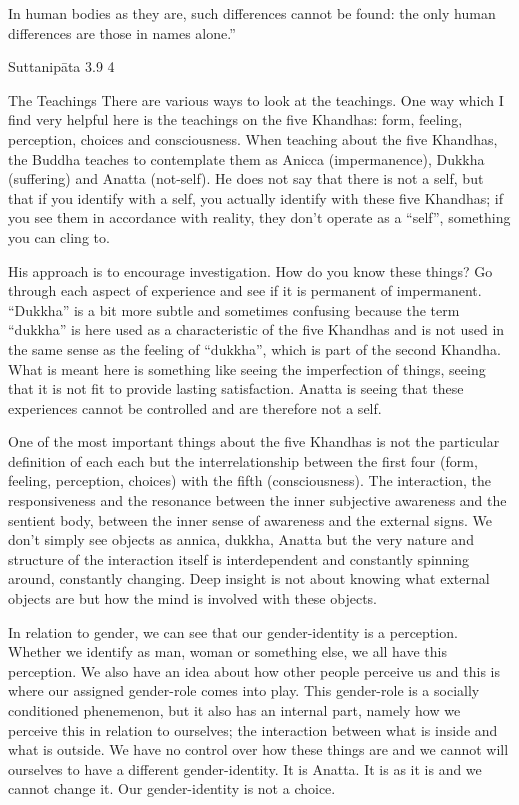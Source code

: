 In human bodies as they are,
such differences cannot be found:
the only human differences
are those in names alone.”

Suttanipāta 3.9 4

The Teachings
There are various ways to look at the teachings. One way which I find very helpful here is the teachings on the five Khandhas: form, feeling, perception, choices and consciousness. When teaching about the five Khandhas, the Buddha teaches to contemplate them as Anicca (impermanence), Dukkha (suffering) and Anatta (not-self). He does not say that there is not a self, but that if you identify with a self, you actually identify with these five Khandhas; if you see them in accordance with reality, they don’t operate as a “self”, something you can cling to.

His approach is to encourage investigation. How do you know these things? Go through each aspect of experience and see if it is permanent of impermanent. “Dukkha” is a bit more subtle and sometimes confusing because the term “dukkha” is here used as a characteristic of the five Khandhas and is not used in the same sense as the feeling of “dukkha”, which is part of the second Khandha. What is meant here is something like seeing the imperfection of things, seeing that it is not fit to provide lasting satisfaction. Anatta is seeing that these experiences cannot be controlled and are therefore not a self.

One of the most important things about the five Khandhas is not the particular definition of each each but the interrelationship between the first four (form, feeling, perception, choices) with the fifth (consciousness). The interaction, the responsiveness and the resonance between the inner subjective awareness and the sentient body, between the inner sense of awareness and the external signs. We don’t simply see objects as annica, dukkha, Anatta but the very nature and structure of the interaction itself is interdependent and constantly spinning around, constantly changing. Deep insight is not about knowing what external objects are but how the mind is involved with these objects.

In relation to gender, we can see that our gender-identity is a perception. Whether we identify as man, woman or something else, we all have this perception. We also have an idea about how other people perceive us and this is where our assigned gender-role comes into play. This gender-role is a socially conditioned phenemenon, but it also has an internal part, namely how we perceive this in relation to ourselves; the interaction between what is inside and what is outside. We have no control over how these things are and we cannot will ourselves to have a different gender-identity. It is Anatta. It is as it is and we cannot change it. Our gender-identity is not a choice.

